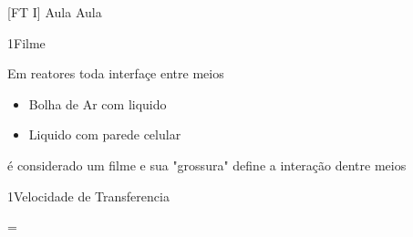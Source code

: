 \documentclass[\mainfilename]{subfiles}
\begin{document}
[FT I]
{Aula}
{Aula}


\begin{definitionBox}1{Filme}
    
    Em reatores toda interfaçe entre meios

    \begin{itemize}
        \item Bolha de Ar com liquido
        \item Liquido com parede celular
    \end{itemize}

    é considerado um filme e sua "grossura" define a interação dentre meios
    
\end{definitionBox}

\begin{definitionBox}1{Velocidade de Transferencia}
    
    \begin{BM}
        = 
    \end{BM}
    
\end{definitionBox}
\end{document}
